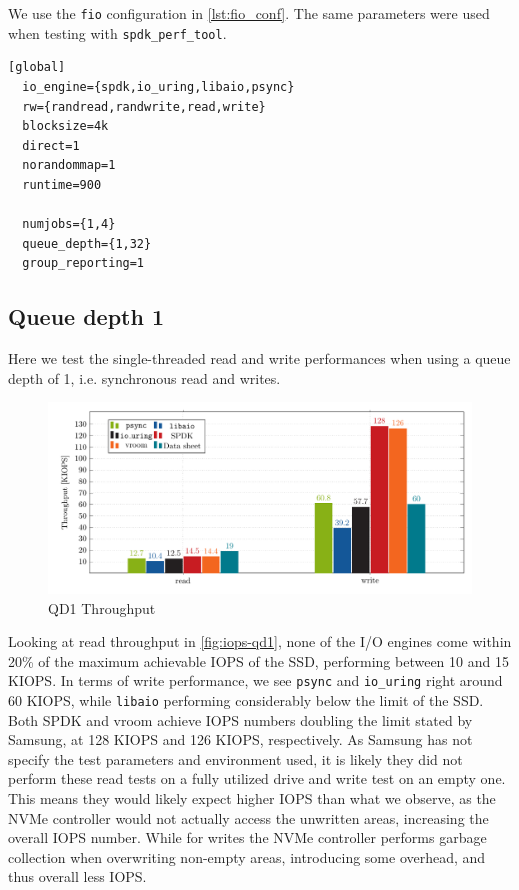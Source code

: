 We use the \texttt{fio} configuration in \autoref{lst:fio_conf}. The same parameters were used when testing with \texttt{spdk\_perf\_tool}.

\begin{lstlisting}[float, label=lst:fio_conf, caption=\texttt{fio} configuration]
  [global]
  io_engine={spdk,io_uring,libaio,psync}
  rw={randread,randwrite,read,write}
  blocksize=4k
  direct=1
  norandommap=1
  runtime=900

  numjobs={1,4}
  queue_depth={1,32}
  group_reporting=1
\end{lstlisting}


\subsection{Queue depth 1}
Here we test the single-threaded read and write performances when using a queue depth of 1, i.e. synchronous read and writes.

\begin{figure}
  \centering
    \includegraphics[width=\textwidth]{figures/iops-qd1-ybar}
    \caption{QD1 Throughput}
    \label{fig:iops-qd1}
\end{figure}

Looking at read throughput in \autoref{fig:iops-qd1}, none of the I/O engines come within 20\% of the maximum achievable IOPS of the SSD, performing between 10 and 15 KIOPS. In terms of write performance, we see \texttt{psync} and \texttt{io\_uring} right around 60 KIOPS, while \texttt{libaio} performing considerably below the limit of the SSD. Both SPDK and vroom achieve IOPS numbers doubling the limit stated by Samsung, at 128 KIOPS and 126 KIOPS, respectively.
As Samsung has not specify the test parameters and environment used, it is likely they did not perform these read tests on a fully utilized drive and write test on an empty one. This means they would likely expect higher IOPS than what we observe, as the NVMe controller would not actually access the unwritten areas, increasing the overall IOPS number. While for writes the NVMe controller performs garbage collection when overwriting non-empty areas, introducing some overhead, and thus overall less IOPS.

